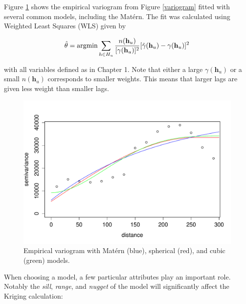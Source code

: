 \documentclass[12pt,twoside]{reedthesis}
\begin{document}
Figure \ref{var_plots} shows the empirical variogram from Figure \ref{variogram} fitted with several common models, including the Mat\'ern. The fit was calculated using Weighted Least Squares (WLS) given by

\begin{align*}
\hat{\mathbf{\theta}} = \text{argmin}\sum_{h \in H_u} {{n(\mathbf{h}_u)}\over{[\gamma(\mathbf{h}_u)]^2}}[\hat\gamma(\mathbf{h}_u) - \gamma(\mathbf{h}_u)]^2
\end{align*}

with all variables defined as in Chapter 1. Note that either a large $\gamma(\mathbf{h}_u)$ or a small $n(\mathbf{h}_u)$ corresponds to smaller weights. This means that larger lags are given less weight than smaller lags. \\

\begin{figure}[h]
	   
	       \centering
	  
	    \includegraphics[scale=0.7]{var_plots}
	
	     \caption{Empirical variogram with Mat\'ern (blue), spherical (red), and cubic (green) models.}
	 \label{var_plots}
	\end{figure}

When choosing a model, a few particular attributes play an important role. Notably the \emph{sill}, \emph{range}, and \emph{nugget} of the model will significantly affect the Kriging calculation:
\end{document}
